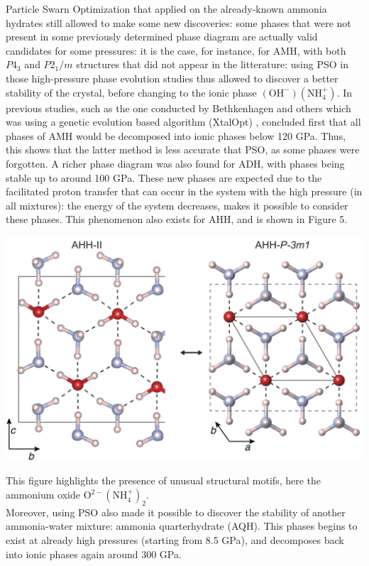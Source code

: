 \documentclass[11pt]{article}
\begin{document}
\begin{multicols}{2}
Particle Swarn Optimization that applied on the already-known ammonia hydrates still allowed to make some new discoveries: some phases that were not present in some previously determined phase diagram are actually valid candidates for some pressures: it is the case, for instance, for AMH, with both $P4_3$ and $P2_1/m$ structures that did not appear in the litterature: using PSO in those high-pressure phase evolution studies thus allowed to discover a better stability of the crystal, before changing to the ionic phase $(\mathrm{OH}^-)(\mathrm{NH}_4^+)$. In previous studies, such as the one conducted by Bethkenhagen and others which was using a genetic evolution based algorithm (XtalOpt) \cite{doi:10.1021/acs.jpca.5b07854}, concluded first that all phases of AMH would be decomposed into ionic phases below 120 GPa. Thus, this shows that the latter method is less accurate that PSO, as some phases were forgotten. A richer phase diagram was also found for ADH, with phases being stable up to around 100 GPa. These new phases are expected due to the facilitated proton transfer that can occur in the system with the high pressure (in all mixtures): the energy of the system decreases, makes it possible to consider these phases. This phenomenon also exists for AHH, and is shown in Figure 5.\bigskip

\noindent\begin{center}
    \includegraphics[width=0.9\columnwidth]{figures/hbond.png}
\end{center}
\medskip 

This figure highlights the presence of unusual structural motifs, here the ammonium oxide $\mathrm{O}^{2-}(\mathrm{N}\mathrm{H}_4^+)_2$.\\
Moreover, using PSO also made it possible to discover the stability of another ammonia-water mixture: ammonia quarterhydrate (AQH). This phases begins to exist at already high pressures (starting from 8.5 GPa), and decomposes back into ionic phases again around 300 GPa.


\end{multicols}
\end{document}
